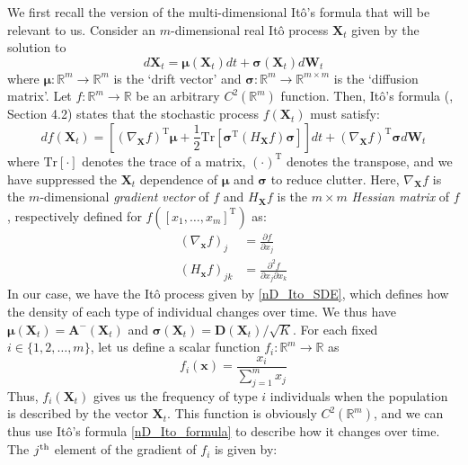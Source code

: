 We first recall the version of the multi-dimensional It\^{o}'s formula that will be relevant to us. Consider an $m$-dimensional real It\^{o} process $\mathbf{X}_t$ given by the solution to
\begin{equation*}
d\mathbf{X}_t = \boldsymbol{\mu}(\mathbf{X}_t)dt + \boldsymbol{\sigma}(\mathbf{X}_t)d\mathbf{W}_t
\end{equation*}
where $\boldsymbol{\mu}: \mathbb{R}^m \to \mathbb{R}^m$ is the `drift vector' and $\boldsymbol{\sigma}: \mathbb{R}^{m} \to \mathbb{R}^{m \times m}$ is the `diffusion matrix'. Let $f: \mathbb{R}^m \to \mathbb{R}$ be an arbitrary $C^2(\mathbb{R}^m)$ function. Then, It\^{o}'s formula (\cite{oksendal_stochastic_1998}, Section 4.2) states that  the stochastic process $f(\mathbf{X}_t)$ must satisfy:
\begin{equation}
\label{nD_Ito_formula}
df(\mathbf{X}_t) = \left[\left(\nabla_{\mathbf{X}}f\right)^{\mathrm{T}}\boldsymbol{\mu} + \frac{1}{2}\mathrm{Tr}[\boldsymbol{\sigma}^{\mathrm{T}}(H_{\mathbf{X}}f)\boldsymbol{\sigma}]\right]dt + \left(\nabla_{\mathbf{X}}f\right)^{\mathrm{T}}\boldsymbol{\sigma}d\mathbf{W}_t
\end{equation}
where $\mathrm{Tr}[\cdot]$ denotes the trace of a matrix, $\left(\cdot\right)^{\mathrm{T}}$ denotes the transpose, and we have suppressed the $\mathbf{X}_t$ dependence of $\boldsymbol{\mu}$ and $\boldsymbol{\sigma}$ to reduce clutter. Here, $\nabla_{\mathbf{X}}f$ is the $m$-dimensional \emph{gradient vector} of $f$ and $H_{\mathbf{X}}f$ is the $m \times m$ \emph{Hessian matrix} of $f$, respectively defined for $f([x_1,\ldots,x_m]^{\mathrm{T}})$ as:
\begin{align*}
\left(\nabla_{\mathbf{x}} f\right)_j &= \frac{\partial f}{\partial x_j}\\
\left(H_{\mathbf{x}} f\right)_{jk} &= \frac{\partial^2 f}{\partial x_j \partial x_k } 
\end{align*}
In our case, we have the It\^{o} process given by \eqref{nD_Ito_SDE}, which defines how the density of each type of individual changes over time. We thus have $\boldsymbol{\mu}(\mathbf{X}_t) = \mathbf{A}^{-}(\mathbf{X}_t)$ and $\boldsymbol{\sigma}(\mathbf{X}_t) = \mathbf{D}(\mathbf{X}_t)/\sqrt{K}$.  For each fixed $i \in \{1,2,\ldots,m\}$, let us define a scalar function $f_i: \mathbb{R}^m \to \mathbb{R}$ as
\begin{equation*}
f_i(\mathbf{x}) = \frac{x_i}{\sum\limits_{j=1}^{m}x_j}
\end{equation*}
Thus, $f_i(\mathbf{X}_t)$ gives us the frequency of type $i$ individuals when the population is described by the vector $\mathbf{X}_t$. This function is obviously $C^2(\mathbb{R}^m)$, and we can thus use It\^{o}'s formula \eqref{nD_Ito_formula} to describe how it changes over time. The $j\textsuperscript{th}$ element of the gradient of $f_i$ is given by:
